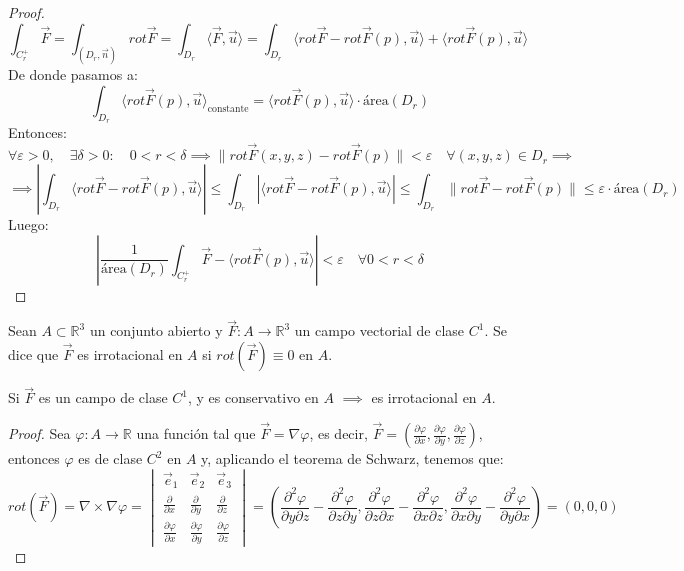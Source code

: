 \begin{proof}
    $$ \int_{C_r^+} \vec{F} = \int_{(D_r, \vec{n})} rot\vec{F} = \int_{D_r} \langle \vec{F}, \vec{u} \rangle = \int_{D_r} \langle rot\vec{F} - rot\vec{F} (p), \vec{u} \rangle + \langle rot\vec{F} (p), \vec{u} \rangle$$
    De donde pasamos a:
    $$ \int_{D_r} \langle rot\vec{F} (p), \vec{u} \rangle_{\text{constante}} = \langle rot\vec{F} (p), \vec{u} \rangle \cdot \text{área}(D_r)$$
    Entonces:
    $$ \forall \varepsilon > 0, \quad \exists \delta > 0: \quad 0 < r < \delta \implies \lVert rot\vec{F} (x,y,z) - rot\vec{F} (p) \rVert < \varepsilon \quad \forall (x,y,z) \in D_r \implies $$
    $$ \implies \left| \int_{D_r} \langle rot\vec{F} - rot\vec{F} (p), \vec{u} \rangle \right| \leq \int_{D_r} \left| \langle rot\vec{F} - rot\vec{F} (p), \vec{u} \rangle \right| \leq \int_{D_r} \lVert rot\vec{F} - rot\vec{F} (p) \rVert \leq \varepsilon \cdot \text{área}(D_r)$$
    Luego:
    $$ \left| \frac{1}{\text{área}(D_r)} \int_{C_r^+} \vec{F} - \langle rot\vec{F} (p), \vec{u} \rangle \right| < \varepsilon \quad \forall 0 < r < \delta$$
\end{proof}

\begin{definición}
    Sean $A \subset \mathbb{R}^3$ un conjunto abierto y $\vec{F} : A \to \mathbb{R}^3$ un campo vectorial de clase $C^1$. Se dice que $\vec{F}$ es irrotacional en $A$ si $rot(\vec{F}) \equiv 0$ en $A$.
\end{definición}

\begin{lema}
    Si $\vec{F}$ es un campo de clase $C^1$, y es conservativo en $A$ $\implies$ es irrotacional en $A$.
\end{lema}

\begin{proof}
    Sea $\varphi: A \to \mathbb{R}$ una función tal que $\vec{F} = \nabla \varphi$, es decir, $\vec{F} = \left( \frac{\partial \varphi}{\partial x}, \frac{\partial \varphi}{\partial y}, \frac{\partial \varphi}{\partial z} \right)$, entonces $\varphi$ es de clase $C^2$ en $A$ y, aplicando el teorema de Schwarz, tenemos que:
    $$ rot(\vec{F}) = \nabla \times \nabla \varphi = \begin{vmatrix}
        \vec{e}_1 & \vec{e}_2 & \vec{e}_3 \\
        \frac{\partial}{\partial x} & \frac{\partial}{\partial y} & \frac{\partial}{\partial z} \\
        \frac{\partial \varphi}{\partial x} & \frac{\partial \varphi}{\partial y} & \frac{\partial \varphi}{\partial z}
    \end{vmatrix} = \left( \frac{\partial^2 \varphi}{\partial y \partial z} - \frac{\partial^2 \varphi}{\partial z \partial y}, \frac{\partial^2 \varphi}{\partial z \partial x} - \frac{\partial^2 \varphi}{\partial x \partial z}, \frac{\partial^2 \varphi}{\partial x \partial y} - \frac{\partial^2 \varphi}{\partial y \partial x} \right) = (0,0,0)$$
\end{proof}

